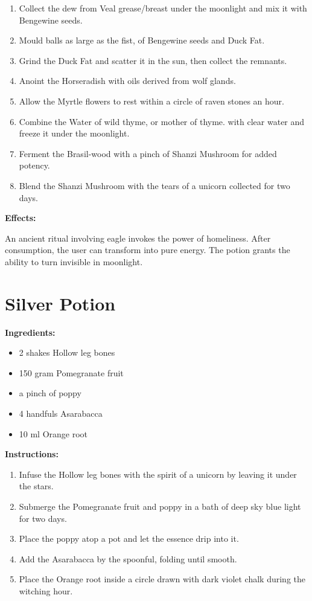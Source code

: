 \documentclass{article}
\begin{document}
\begin{enumerate}
  \item Collect the dew from Veal grease/breast under the moonlight and mix it with Bengewine seeds.
  \item Mould balls as large as the fist, of Bengewine seeds and Duck Fat.
  \item Grind the Duck Fat and scatter it in the sun, then collect the remnants.
  \item Anoint the Horseradish with oils derived from wolf glands.
  \item Allow the Myrtle flowers to rest within a circle of raven stones an hour.
  \item Combine the Water of wild thyme, or mother of thyme. with clear water and freeze it under the moonlight.
  \item Ferment the Brasil-wood with a pinch of Shanzi Mushroom for added potency.
  \item Blend the Shanzi Mushroom with the tears of a unicorn collected for two days.
\end{enumerate}

\textbf{Effects:}

An ancient ritual involving eagle invokes the power of homeliness. After consumption, the user can transform into pure energy. The potion grants the ability to turn invisible in moonlight.

\newpage
\section*{Silver Potion}

\textbf{Ingredients:}

\begin{itemize}
  \item 2 shakes Hollow leg bones
  \item 150 gram Pomegranate fruit
  \item a pinch of poppy
  \item 4 handfuls Asarabacca
  \item 10 ml Orange root
\end{itemize}

\textbf{Instructions:}

\begin{enumerate}
  \item Infuse the Hollow leg bones with the spirit of a unicorn by leaving it under the stars.
  \item Submerge the Pomegranate fruit and poppy in a bath of deep sky blue light for two days.
  \item Place the poppy atop a pot and let the essence drip into it.
  \item Add the Asarabacca by the spoonful, folding until smooth.
  \item Place the Orange root inside a circle drawn with dark violet chalk during the witching hour.
\end{enumerate}
\end{document}
